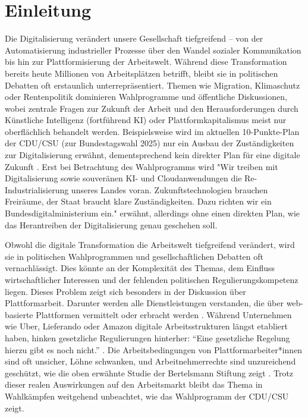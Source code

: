 \documentclass[12pt]{article}
\begin{document}
\section{Einleitung}
Die Digitalisierung verändert unsere Gesellschaft tiefgreifend – von der Automatisierung industrieller Prozesse über den Wandel sozialer Kommunikation bis hin zur Plattformisierung der Arbeitswelt. Während diese Transformation bereits heute Millionen von Arbeitsplätzen betrifft, bleibt sie in politischen Debatten oft erstaunlich unterrepräsentiert. Themen wie Migration, Klimaschutz oder Rentenpolitik dominieren Wahlprogramme und öffentliche Diskussionen, wobei zentrale Fragen zur Zukunft der Arbeit und den Herausforderungen durch Künstliche Intelligenz (fortführend KI) oder Plattformkapitalismus meist nur oberflächlich behandelt werden. Beispielsweise wird im aktuellen 10-Punkte-Plan der CDU/CSU (zur Bundestagswahl 2025) nur ein Ausbau der Zuständigkeiten zur Digitalisierung erwähnt, dementsprechend kein direkter Plan für eine digitale Zukunft \autocite[vgl.][]{cducsu_10_2025}. Erst bei Betrachtung des Wahlprogramms wird "Wir treiben mit Digitalisierung sowie souveränen KI- und Cloudanwendungen die Re-Industrialisierung unseres Landes voran. Zukunftstechnologien brauchen Freiräume, der Staat braucht klare Zuständigkeiten. Dazu richten wir ein Bundesdigitalministerium ein." \autocite[vgl.][]{cducsu_kurzfassung_2025} erwähnt, allerdings ohne einen direkten Plan, wie das Herantreiben der Digitalisierung genau geschehen soll.

Obwohl die digitale Transformation die Arbeitswelt tiefgreifend verändert, wird sie in politischen Wahlprogrammen und gesellschaftlichen Debatten oft vernachlässigt. Dies könnte an der Komplexität des Themas, dem Einfluss wirtschaftlicher Interessen und der fehlenden politischen Regulierungskompetenz liegen. Dieses Problem zeigt sich besonders in der Diskussion über Plattformarbeit. Darunter werden alle Dienstleistungen verstanden, die über web-basierte Plattformen vermittelt oder erbracht werden \autocite[vgl.][]{bertelsmann_stiftung_plattformarbeit_2019}. 
Während Unternehmen wie Uber, Lieferando oder Amazon digitale Arbeitsstrukturen längst etabliert haben, hinken gesetzliche Regulierungen hinterher: \enquote{Eine gesetzliche Regelung hierzu gibt es noch nicht.} \autocite[vgl.][]{bmas_bundesministerium_nodate}. 
Die Arbeitsbedingungen von Plattformarbeiter*innen sind oft unsicher, Löhne schwanken, und Arbeitnehmerrechte sind unzureichend geschützt, wie die oben erwähnte Studie der Bertelsmann Stiftung zeigt \autocite[vgl.][S. 25]{bertelsmann_stiftung_plattformarbeit_2019}. 
Trotz dieser realen Auswirkungen auf den Arbeitsmarkt bleibt das Thema in Wahlkämpfen weitgehend unbeachtet, wie das Wahlprogramm der CDU/CSU zeigt. 
\end{document}
